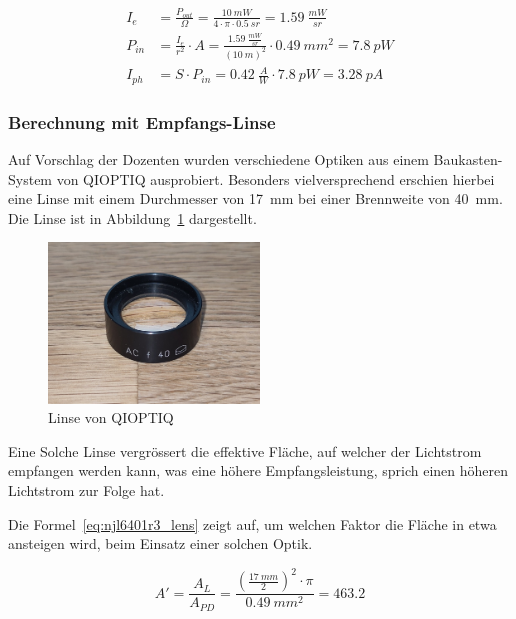\begin{equation}\label{eq:rld65nzx1_njl6401r3_num}
    \begin{split}
        I_e    &= \frac{P_{out}}{\Omega} = \frac{10~mW}{4\cdot \pi \cdot 0.5~sr} = 1.59~\frac{mW}{sr}\\
        P_{in} &= \frac{I_e}{r^2} \cdot A = \frac{1.59~\frac{mW}{sr}}{(10~m)^2} \cdot 0.49~mm^2 = 7.8~pW\\
        I_{ph} &= S \cdot P_{in} = 0.42~\frac{A}{W} \cdot 7.8~pW = 3.28~pA
    \end{split}
\end{equation}

\subsubsection{Berechnung mit Empfangs-Linse}

Auf Vorschlag der Dozenten wurden verschiedene Optiken aus einem Baukasten-System von QIOPTIQ ausprobiert.
Besonders vielversprechend erschien hierbei eine Linse mit einem Durchmesser von 17~mm bei einer Brennweite von
40~mm. Die Linse ist in Abbildung~\ref{fig:lens} dargestellt.

\begin{figure}[H]
    \centering
    \includegraphics[width=0.5\textwidth]{graphics/photo_lens.jpg}
    \caption{Linse von QIOPTIQ}\label{fig:lens}
\end{figure}

Eine Solche Linse vergrössert die effektive Fläche, auf welcher der Lichtstrom empfangen werden kann, was
eine höhere Empfangsleistung, sprich einen höheren Lichtstrom zur Folge hat.

Die Formel~\ref{eq:njl6401r3_lens} zeigt auf, um welchen Faktor die Fläche in etwa ansteigen wird, beim Einsatz einer
solchen Optik.

\begin{equation}\label{eq:njl6401r3_lens}
    A' = \frac{A_{L}}{A_{PD}} = \frac{(\frac{17~mm}{2})^2 \cdot \pi}{0.49~mm^2} = 463.2
\end{equation}

